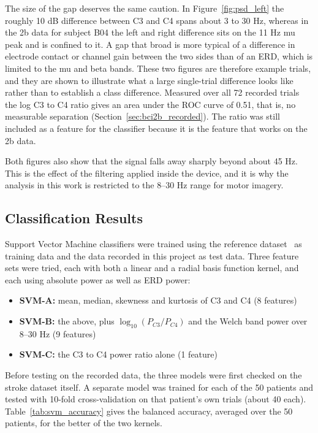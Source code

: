 The size of the gap deserves the same caution. In Figure~\ref{fig:psd_left} the roughly
10 dB difference between C3 and C4 spans about 3 to 30 Hz, whereas in the 2b data for
subject B04 the left and right difference sits on the 11 Hz mu peak and is confined to it.
A gap that broad is more typical of a difference in electrode contact or channel gain
between the two sides than of an ERD, which is limited to the mu and beta bands. These two
figures are therefore example trials, and they are shown to illustrate what a large
single-trial difference looks like rather than to establish a class difference. Measured
over all 72 recorded trials the log C3 to C4 ratio gives an area under the ROC curve of
0.51, that is, no measurable separation (Section~\ref{sec:bci2b_recorded}). The ratio was
still included as a feature for the classifier because it is the feature that works on the
2b data.

Both figures also show that the signal falls away sharply beyond about 45 Hz. This is the
effect of the filtering applied inside the device, and it is why the analysis in this work
is restricted to the 8--30 Hz range for motor imagery.

\FloatBarrier

\subsection{Classification Results}

Support Vector Machine classifiers were trained using the reference
dataset~\cite{liu2024mi} as training data and the data recorded in this project as test
data. Three feature sets were tried, each with both a linear and a radial basis function
kernel, and each using absolute power as well as ERD power:

\begin{itemize}
    \item \textbf{SVM-A:} mean, median, skewness and kurtosis of C3 and C4 (8 features)
    \item \textbf{SVM-B:} the above, plus $\log_{10}(P_{C3}/P_{C4})$ and the Welch band
          power over 8--30 Hz (9 features)
    \item \textbf{SVM-C:} the C3 to C4 power ratio alone (1 feature)
\end{itemize}

Before testing on the recorded data, the three models were first checked on the stroke
dataset itself. A separate model was trained for each of the 50 patients and tested with
10-fold cross-validation on that patient's own trials (about 40 each). Table~\ref{tab:svm_accuracy}
gives the balanced accuracy, averaged over the 50 patients, for the better of the two
kernels.

